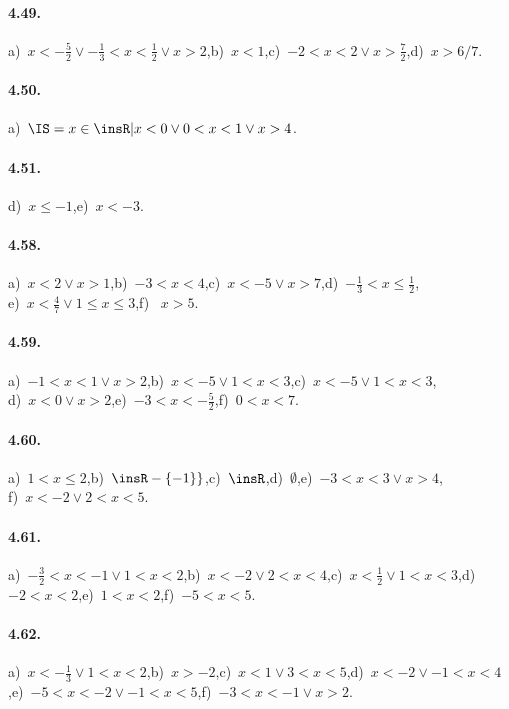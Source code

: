 \paragraph{4.49.} a)~$x<-\frac 5 2\vee -\frac 1 3<x<\frac 1 2\vee x>2$,\quad b)~$x<1$,\quad c)~$-2<x<2\vee x>\frac 7 2$,\quad d)~$x>6/7$.

\paragraph{4.50.} a)~$\IS=x\in \insR| x<0\vee 0<x<1\vee x>4$.

\paragraph{4.51.} d)~$x\le -1$,\quad e)~$x<-3$.

\paragraph{4.58.} a)~$x<2\vee x>1$,\quad b)~$-3<x<4$,\quad c)~$x<-5\vee x>7$,\quad d)~$-\frac 1 3<x\le \frac 1 2$,\protect\\
e)~$x<\frac 4 7\vee 1\le x\le 3$,\quad f)~ $x>5$.

\paragraph{4.59.} a)~$-1<x<1\vee x>2$,\quad b)~$x<-5\vee 1<x<3$,\quad c)~$x<-5\vee 1<x<3$,\protect\\
d)~$x<0\vee x>2$,\quad e)~$-3<x<-\frac 5 2$,\quad f)~$0<x<7$.

\paragraph{4.60.} a)~$1< x\le 2$,\quad b)~$\insR-\{-1\}\}$,\quad c)~$\insR$,\quad d)~$\emptyset $,\quad e)~$-3<x<3\vee x>4$,\protect\\
f)~$x<-2\vee 2<x<5$.

\paragraph{4.61.} a)~$-\frac 3 2<x<-1\vee 1<x<2$,\quad b)~$x<-2\vee 2<x<4$,\quad c)~$x<\frac 1 2\vee 1<x<3$,\quad d)~$-2<x<2$,\quad e)~$1<x<2$,\quad f)~$-5<x<5$.

\paragraph{4.62.} a)~$x<-\frac 1 3\vee 1<x<2$,\quad b)~$x>-2$,\quad c)~$x<1\vee 3<x<5$,\quad d)~$x<-2\vee -1<x<4$,\quad e)~$-5<x<-2\vee -1<x<5$,\quad f)~$-3<x<-1\vee x>2$.


